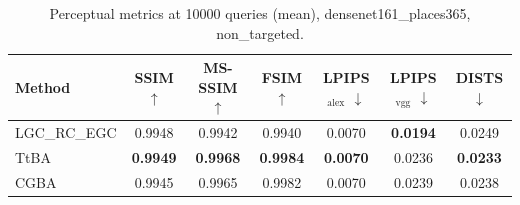 \begin{table}[t]
\centering\footnotesize
\caption{Perceptual metrics at 10000 queries (mean), densenet161\_places365, non\_targeted.}
\begin{tabular}{lcccccc}
\toprule
Method & SSIM $\uparrow$ & MS-SSIM $\uparrow$ & FSIM $\uparrow$ & LPIPS$_{\mathrm{alex}}$ $\downarrow$ & LPIPS$_{\mathrm{vgg}}$ $\downarrow$ & DISTS $\downarrow$ \\
\midrule
LGC\_RC\_EGC & 0.9948 & 0.9942 & 0.9940 & 0.0070 & \textbf{0.0194} & 0.0249 \\
TtBA & \textbf{0.9949} & \textbf{0.9968} & \textbf{0.9984} & \textbf{0.0070} & 0.0236 & \textbf{0.0233} \\
CGBA & 0.9945 & 0.9965 & 0.9982 & 0.0070 & 0.0239 & 0.0238 \\
\bottomrule
\end{tabular}
\end{table}
